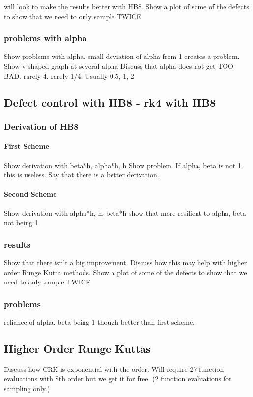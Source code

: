 \documentclass{article}
\begin{document}
will look to make the results better with HB8.
Show a plot of some of the defects to show that we need to only sample TWICE
\subsubsection{problems with alpha}
Show problems with alpha. small deviation of alpha from 1 creates a problem. Show v-shaped graph at several alpha
Discuss that alpha does not get TOO BAD. rarely 4. rarely 1/4. Usually 0.5, 1, 2


\subsection{Defect control with HB8 - rk4 with HB8}
\subsubsection{Derivation of HB8}
\paragraph{First Scheme}
Show derivation with beta*h, alpha*h, h
Show problem. If alpha, beta is not 1. this is useless.
Say that there is a better derivation.

\paragraph{Second Scheme}
Show derivation with alpha*h, h, beta*h
show that more resilient to alpha, beta not being 1.

\subsubsection{results}
Show that there isn't a big improvement. Discuss how this may help with higher order Runge Kutta methods.
Show a plot of some of the defects to show that we need to only sample TWICE
\subsubsection{problems}
reliance of alpha, beta being 1 though better than first scheme. 

\subsection{Higher Order Runge Kuttas}
Discuss how CRK is exponential with the order. Will require 27 function evaluations with 8th order but we get it for free. (2 function evaluations for sampling only.)
\end{document}
